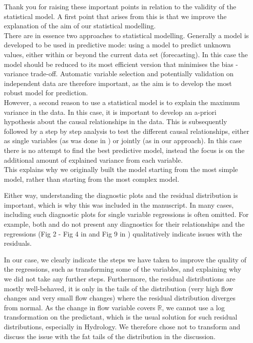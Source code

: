 \documentclass[]{elsarticle} %
\begin{document}
Thank you for raising these important points in relation to the validity of the statistical model.
A first point that arises from this is that we improve the explanation of the aim of our statistical modelling.\\
There are in essence two approaches to statistical modelling. Generally a model is developed to be used in predictive mode: using a model to predict unknown values, either within or beyond the current data set (forecasting). In this case the model should be reduced to its most efficient version that minimises the bias - variance trade-off. Automatic variable selection and potentially validation on independent data are therefore important, as the aim is to develop the most robust model for prediction.\\
However, a second reason to use a statistical model is to explain the maximum variance in the data. In this case, it is important to develop an a-priori hypothesis about the causal relationships in the data. This is subsequently followed by a step by step analysis to test the different causal relationships, either as single variables (as was done in \citet{zhang2017}) or jointly (as in our approach). In this case there is no attempt to find the best predictive model, instead the focus is on the additional amount of explained variance from each variable.\\
This explains why we originally built the model starting from the most simple model, rather than starting from the most complex model.

Either way, understanding the diagnostic plots and the residual distribution is important, which is why this was included in the manuscript. In many cases, including such diagnostic plots for single variable regressions is often omitted. For example, both \citet{zhang2017} and \citet{filoso2017} do not present any diagnostics for their relationships and the regressions (Fig 2 - Fig 4 in \citet{zhang2017} and Fig 9 in \citet{filoso2017}) qualitatively indicate issues with the residuals.

In our case, we clearly indicate the steps we have taken to improve the quality of the regressions, such as transforming some of the variables, and explaining why we did not take any further steps. Furthermore, the residual distributions are mostly well-behaved, it is only in the tails of the distribution (very high flow changes and very small flow changes) where the residual distribution diverges from normal. As the change in flow variable covers \(\mathbb{R}\), we cannot use a log transformation on the predictant, which is the usual solution for such residual distributions, especially in Hydrology. We therefore chose not to transform and discuss the issue with the fat tails of the distribution in the discussion.
\end{document}
